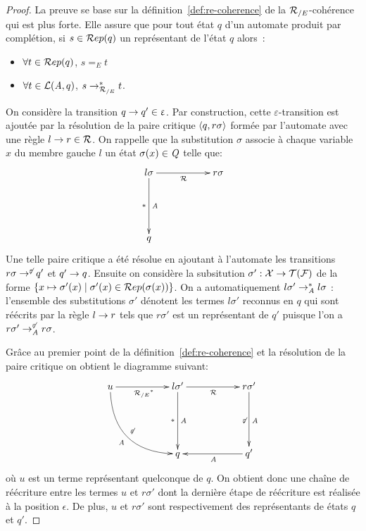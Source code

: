 \begin{proof}
  La preuve se base sur la définition~\ref{def:re-coherence} de la ${\mathcal R_{/E}}$-cohérence qui est plus forte.
  Elle assure que pour tout état $q$ d'un automate produit par complétion, si $s \in \mathcal R ep (q)$ un représentant de l'état $q$
  alors~:
  \begin{itemize}
  \item $\forall t \in \mathcal R ep(q)$, $s =_E t$
  \item $\forall t \in \mathcal{L}(\mathit A, q)$, $s \rightarrow_{\mathcal R_{/E}}^* t$.
  \end{itemize}

  On considère la transition $q \rightarrow q' \in \upvarepsilon$. Par construction, cette $\varepsilon$-transition est ajoutée
  par la résolution de la paire critique $\langle q, r\sigma\rangle$ formée par l'automate avec une règle $l\rightarrow r \in \mathcal R$.
  On rappelle que la substitution $\sigma$ associe à chaque variable $x$ du membre gauche $l$ un état $\sigma(x) \in \mathit Q$
  telle que:
  \[
  \xymatrix{
    l\sigma \ar[dd]^{\A}_{*} \ar[rr]_{\R}  & & r\sigma\\ %
    & & \\
    q & &%
  }
  \]
  Une telle paire critique a été résolue en ajoutant à l'automate les transitions $r\sigma \rightarrow^{\not\varepsilon} q'$ et $q' \rightarrow q$.
  Ensuite on considère la subsitution $\sigma' : \mathcal X \rightarrow \mathcal{T(F)}$ de la forme
  $\{ x \mapsto \sigma'(x) \; | \; \sigma'(x) \in \mathcal R ep(\sigma(x)) \}$. On a automatiquement $l\sigma' \rightarrow_{\mathit A}^* l\sigma$ :
  l'ensemble des substitutions $\sigma'$ dénotent les termes $l\sigma'$ reconnus en $q$ qui sont réécrits par la règle $l \rightarrow r$ 
  tels que  $r\sigma'$ est un représentant de $q'$ puisque l'on a $r\sigma' \rightarrow^{\not\varepsilon}_{\mathit A} r\sigma$.

  Grâce au premier point de la définition~\ref{def:re-coherence} et la résolution de la paire critique
  on obtient le diagramme suivant:
  \[
  \xymatrix{
    u \ar[rr]_{\RE^*} \ar@/_2pc/[rrdd]^{\not\varepsilon}_{\A} & & l\sigma' \ar[dd]^{\A}_{*} \ar[rr]_{\R}  & & r\sigma' \ar[dd]^{\A}_{\not\varepsilon}\\
    & & & & \\
    & & q & & q' \ar[ll]^{\A}
  }
  \]
  où $u$ est un terme représentant quelconque de $q$. On obtient donc une chaîne de réécriture entre les termes $u$ et $r\sigma'$
  dont la dernière étape de réécriture est réalisée à la position $\epsilon$. De plus, 
  $u$ et $r\sigma'$ sont respectivement des représentants de états $q$ et $q'$.


\end{proof}
